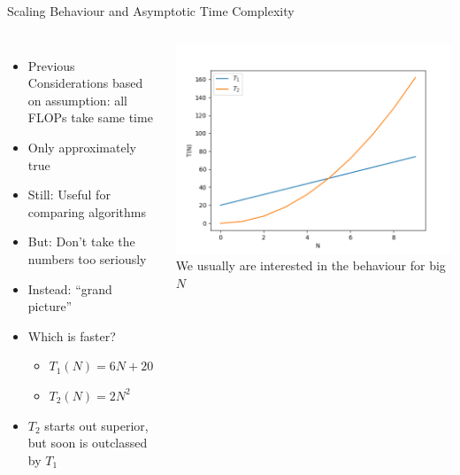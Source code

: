 \begin{frame}{Scaling Behaviour and Asymptotic Time Complexity}
%
\begin{columns}[T]
\begin{itemize}
\item Previous Considerations based on assumption: all FLOPs take same time
\item Only approximately true
\item Still: Useful for comparing algorithms
\item But: Don't take the numbers too seriously
\item Instead: \enquote{grand picture}
\item Which is faster?
	\begin{itemize}
	\item $T_1(N) = 6N + 20$
	\item $T_2(N) = 2N^2$
	\end{itemize}
\item $T_2$ starts out superior, but soon is outclassed by $T_1$
\end{itemize}
%
\includegraphics[width=\linewidth]{./gfx/linearVsQuadratic}
We usually are interested in the behaviour for big $N$
\end{columns}
%
\end{frame}


